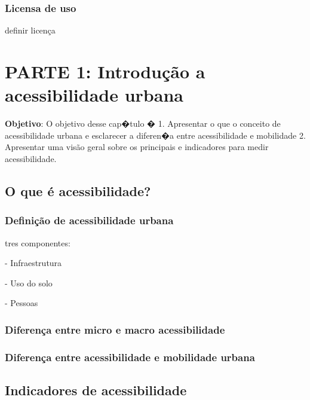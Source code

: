 \documentclass[
  letterpaper,
  DIV=11,
  numbers=noendperiod]{scrreprt}
\begin{document}
\hypertarget{licensa-de-uso}{%
\section*{Licensa de uso}\label{licensa-de-uso}}

definir licença

\part{PARTE 1: Introdução a acessibilidade urbana}

\textbf{Objetivo}: O objetivo desse cap�tulo � 1. Apresentar o que o
conceito de acessibilidade urbana e esclarecer a diferen�a entre
acessibilidade e mobilidade 2. Apresentar uma visão geral sobre os
principais e indicadores para medir acessibilidade.

\hypertarget{o-que-uxe9-acessibilidade}{%
\chapter{O que é acessibilidade?}\label{o-que-uxe9-acessibilidade}}

\hypertarget{definiuxe7uxe3o-de-acessibilidade-urbana}{%
\section{Definição de acessibilidade
urbana}\label{definiuxe7uxe3o-de-acessibilidade-urbana}}

tres componentes:

- Infraestrutura

- Uso do solo

- Pessoas

\hypertarget{diferenuxe7a-entre-micro-e-macro-acessibilidade}{%
\section{Diferença entre micro e macro
acessibilidade}\label{diferenuxe7a-entre-micro-e-macro-acessibilidade}}

\hypertarget{diferenuxe7a-entre-acessibilidade-e-mobilidade-urbana}{%
\section{Diferença entre acessibilidade e mobilidade
urbana}\label{diferenuxe7a-entre-acessibilidade-e-mobilidade-urbana}}

\hypertarget{indicadores-de-acessibilidade}{%
\chapter{Indicadores de
acessibilidade}\label{indicadores-de-acessibilidade}}
\end{document}
